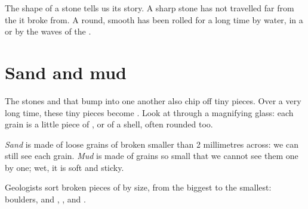 \begin{remark}\label{rem:g3:stones-pebbles-sand:shape}
The shape of a stone tells us its story. A sharp stone has not travelled
far from the  it broke from. A round, smooth  has been rolled for
a long time by water, in a  or by the waves of the .
\end{remark}

\section{Sand and mud}

The stones and  that bump into one another also chip off tiny
pieces. Over a very long time, these tiny pieces become . Look at 
through a magnifying glass: each grain is a little piece of , or of a
shell, often rounded too.

\begin{definition}\label{def:g3:stones-pebbles-sand:sand}
\emph{Sand} is made of loose grains of broken  smaller than
2 millimetres across: we can still see each grain. \emph{Mud} is
made of grains so small that we cannot see them one by one; wet, it is
soft and sticky.
\end{definition}

Geologists sort broken pieces of  by size, from the biggest to the
smallest: boulders,  and , , and .

